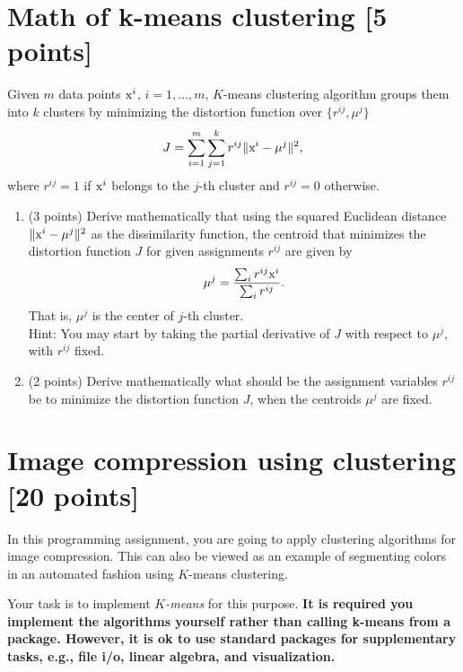\documentclass[twoside,10pt]{article}
\begin{document}
\section{Math of k-means clustering [5 points]}
 Given $m$ data points $\text x^i$, $i=1,\dots, m$, $K$-means clustering algorithm groups them into $k$ clusters by minimizing the distortion function over $\{ r^{ij}, \mu^j \}$
\begin{equation}
J =\sum_{i=1}^m\sum_{j=1}^k r^{ij} \|\text x^i-\mu^j\|^2,
\label{J_def}
\end{equation}
where $r^{ij}=1$ if $\text x^i$ belongs to the $j$-th cluster and $r^{ij}=0$ otherwise.

\begin{enumerate}

\item (3 points) Derive mathematically that using the squared Euclidean distance $\|\text x^i-\mu^j\|^2$ as the dissimilarity function, the centroid that minimizes the distortion function $J$  for given assignments $r^{ij}$ are given by
   $$\mu^j=\frac{\sum_i r^{ij} \text x^i}{\sum_i r^{ij}}.$$
   That is, $\mu^j$ is the center of $j$-th cluster.  \\
   Hint: You may start by taking the partial derivative of $J$ with respect to $\mu^j$, with $r^{ij}$ fixed.
   
   
\item (2 points) Derive mathematically what should be the assignment variables $r^{ij}$ be to minimize the distortion function $J$, when the centroids $\mu^j$ are fixed.

\end{enumerate}



\section{Image compression using clustering [20 points]}

In this programming assignment, you are going to apply clustering algorithms for image compression. This can also be viewed as an example of segmenting colors in an automated fashion using $K$-means clustering.

Your task is to implement \emph{$K$-means} for this purpose.  {\bf It is required you implement the algorithms yourself rather than calling k-means from a package. However, it is ok to use standard packages for supplementary tasks, e.g., file i/o, linear algebra, and visualization.} 
\end{document}

